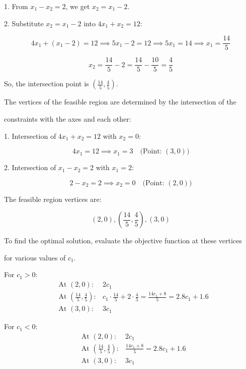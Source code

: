 \documentclass{article}
\begin{document}
\vspace{\baselineskip}

1. From \( x_1 - x_2 = 2 \), we get \( x_2 = x_1 - 2 \).

2. Substitute \( x_2 = x_1 - 2 \) into \( 4x_1 + x_2 = 12 \):

\[
4x_1 + (x_1 - 2) = 12 \implies 5x_1 - 2 = 12 \implies 5x_1 = 14 \implies x_1 = \frac{14}{5}
\]

\[
x_2 = \frac{14}{5} - 2 = \frac{14}{5} - \frac{10}{5} = \frac{4}{5}
\]

So, the intersection point is \( \left( \frac{14}{5}, \frac{4}{5} \right) \).

\vspace{\baselineskip}

The vertices of the feasible region are determined by the intersection of the 

constraints with the axes and each other:

\vspace{\baselineskip}

1. Intersection of \( 4x_1 + x_2 = 12 \) with \( x_2 = 0 \):

\[
4x_1 = 12 \implies x_1 = 3 \quad \text{(Point: } (3, 0))
\]

2. Intersection of \( x_1 - x_2 = 2 \) with \( x_1 = 2 \):

\[
2 - x_2 = 2 \implies x_2 = 0 \quad \text{(Point: } (2, 0))
\]

The feasible region vertices are:

\[
(2, 0), \left( \frac{14}{5}, \frac{4}{5} \right), (3, 0)
\]


To find the optimal solution, evaluate the objective function at these vertices 

for various values of \( c_1 \).

\vspace{\baselineskip}

For \( c_1 > 0 \):
\[
\begin{aligned}
&\text{At } (2, 0): & 2c_1 \\
&\text{At } \left( \frac{14}{5}, \frac{4}{5} \right): & c_1 \cdot \frac{14}{5} + 2 \cdot \frac{4}{5} = \frac{14c_1 + 8}{5} = 2.8c_1 + 1.6 \\
&\text{At } (3, 0): & 3c_1
\end{aligned}
\]

\vspace{\baselineskip}

For \( c_1 < 0 \):
\[
\begin{aligned}
&\text{At } (2, 0): & 2c_1 \\
&\text{At } \left( \frac{14}{5}, \frac{4}{5} \right): & \frac{14c_1 + 8}{5} = 2.8c_1 + 1.6 \\
&\text{At } (3, 0): & 3c_1
\end{aligned}
\]
\end{document}
